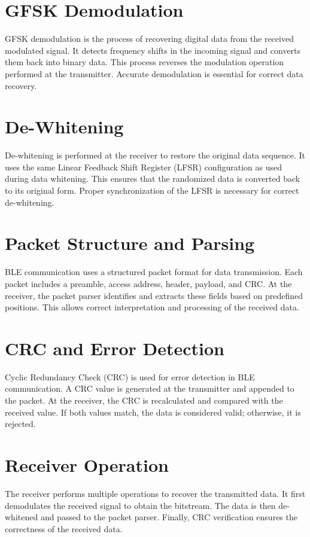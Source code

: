 \documentclass[12pt,singleside,a4paper]{report}
\begin{document}
\section{GFSK Demodulation}
GFSK demodulation is the process of recovering digital data from the received modulated signal. It detects frequency shifts in the incoming signal and converts them back into binary data. This process reverses the modulation operation performed at the transmitter. Accurate demodulation is essential for correct data recovery.

\section{De-Whitening}
De-whitening is performed at the receiver to restore the original data sequence. It uses the same Linear Feedback Shift Register (LFSR) configuration as used during data whitening. This ensures that the randomized data is converted back to its original form. Proper synchronization of the LFSR is necessary for correct de-whitening.

\section{Packet Structure and Parsing}
BLE communication uses a structured packet format for data transmission. Each packet includes a preamble, access address, header, payload, and CRC. At the receiver, the packet parser identifies and extracts these fields based on predefined positions. This allows correct interpretation and processing of the received data.

\section{CRC and Error Detection}
Cyclic Redundancy Check (CRC) is used for error detection in BLE communication. A CRC value is generated at the transmitter and appended to the packet. At the receiver, the CRC is recalculated and compared with the received value. If both values match, the data is considered valid; otherwise, it is rejected.

\section{Receiver Operation}
The receiver performs multiple operations to recover the transmitted data. It first demodulates the received signal to obtain the bitstream. The data is then de-whitened and passed to the packet parser. Finally, CRC verification ensures the correctness of the received data.
\end{document}
